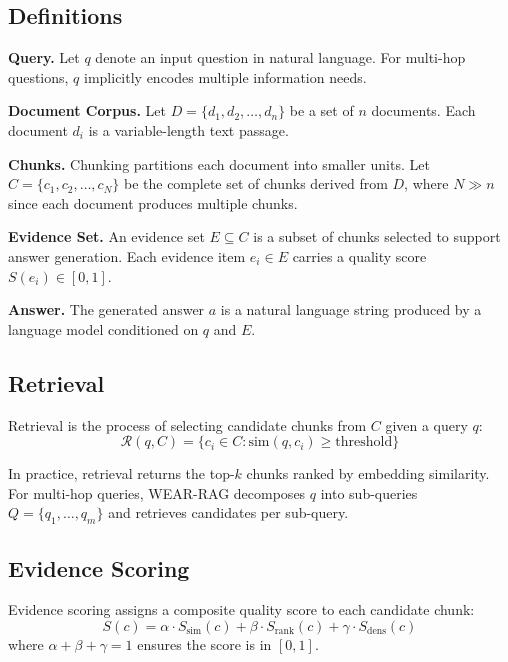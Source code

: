 \documentclass[conference]{IEEEtran}
\begin{document}
\subsection{Definitions}

\textbf{Query.} Let $q$ denote an input question in natural language. For multi-hop questions, $q$ implicitly encodes multiple information needs.

\textbf{Document Corpus.} Let $D = \{d_1, d_2, \ldots, d_n\}$ be a set of $n$ documents. Each document $d_i$ is a variable-length text passage.

\textbf{Chunks.} Chunking partitions each document into smaller units. Let $C = \{c_1, c_2, \ldots, c_N\}$ be the complete set of chunks derived from $D$, where $N \gg n$ since each document produces multiple chunks.

\textbf{Evidence Set.} An evidence set $E \subseteq C$ is a subset of chunks selected to support answer generation. Each evidence item $e_i \in E$ carries a quality score $S(e_i) \in [0, 1]$.

\textbf{Answer.} The generated answer $a$ is a natural language string produced by a language model conditioned on $q$ and $E$.

\subsection{Retrieval}
Retrieval is the process of selecting candidate chunks from $C$ given a query $q$:
\begin{equation}
\mathcal{R}(q, C) = \{c_i \in C : \text{sim}(q, c_i) \geq \text{threshold}\}
\end{equation}

In practice, retrieval returns the top-$k$ chunks ranked by embedding similarity. For multi-hop queries, WEAR-RAG decomposes $q$ into sub-queries $Q = \{q_1, \ldots, q_m\}$ and retrieves candidates per sub-query.

\subsection{Evidence Scoring}
Evidence scoring assigns a composite quality score to each candidate chunk:
\begin{equation}
S(c) = \alpha \cdot S_{\text{sim}}(c) + \beta \cdot S_{\text{rank}}(c) + \gamma \cdot S_{\text{dens}}(c)
\label{eq:scoring}
\end{equation}
where $\alpha + \beta + \gamma = 1$ ensures the score is in $[0, 1]$.
\end{document}
